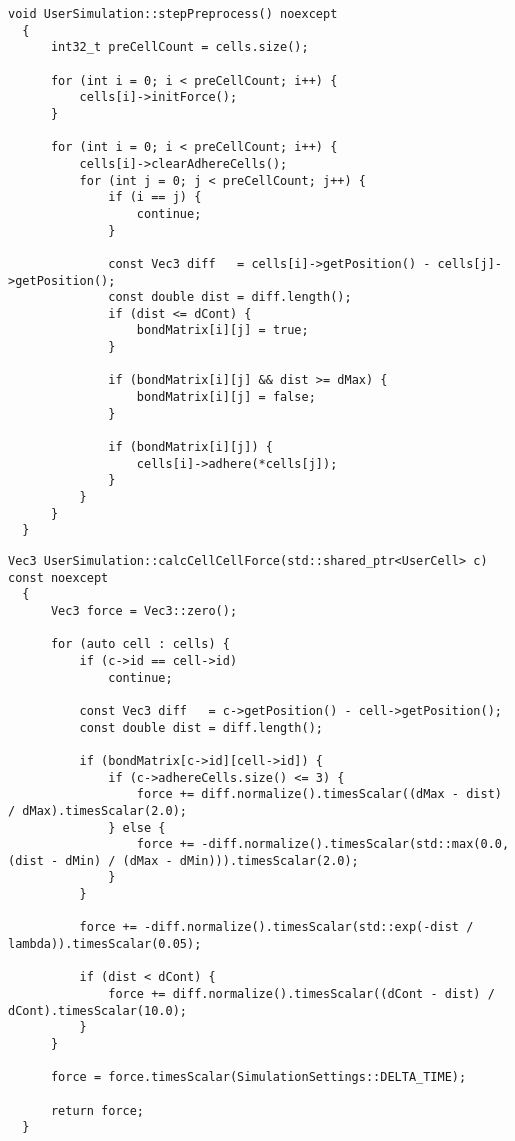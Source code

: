 \documentclass[vipdfmx,a4paper,11pt]{jsarticle}
\begin{document}
\begin{lstlisting}[caption=stepPreprocess()]
  void UserSimulation::stepPreprocess() noexcept
  {
      int32_t preCellCount = cells.size();
  
      for (int i = 0; i < preCellCount; i++) {
          cells[i]->initForce();
      }
  
      for (int i = 0; i < preCellCount; i++) {
          cells[i]->clearAdhereCells();
          for (int j = 0; j < preCellCount; j++) {
              if (i == j) {
                  continue;
              }
  
              const Vec3 diff   = cells[i]->getPosition() - cells[j]->getPosition();
              const double dist = diff.length();
              if (dist <= dCont) {
                  bondMatrix[i][j] = true;
              }
  
              if (bondMatrix[i][j] && dist >= dMax) {
                  bondMatrix[i][j] = false;
              }
  
              if (bondMatrix[i][j]) {
                  cells[i]->adhere(*cells[j]);
              }
          }
      }
  }
\end{lstlisting}

\begin{lstlisting}[caption=calcCellCellForce()]
  Vec3 UserSimulation::calcCellCellForce(std::shared_ptr<UserCell> c) const noexcept
  {
      Vec3 force = Vec3::zero();
  
      for (auto cell : cells) {
          if (c->id == cell->id)
              continue;
  
          const Vec3 diff   = c->getPosition() - cell->getPosition();
          const double dist = diff.length();
  
          if (bondMatrix[c->id][cell->id]) {
              if (c->adhereCells.size() <= 3) {
                  force += diff.normalize().timesScalar((dMax - dist) / dMax).timesScalar(2.0);
              } else {
                  force += -diff.normalize().timesScalar(std::max(0.0, (dist - dMin) / (dMax - dMin))).timesScalar(2.0);
              }
          }
  
          force += -diff.normalize().timesScalar(std::exp(-dist / lambda)).timesScalar(0.05);
  
          if (dist < dCont) {
              force += diff.normalize().timesScalar((dCont - dist) / dCont).timesScalar(10.0);
          }
      }
  
      force = force.timesScalar(SimulationSettings::DELTA_TIME);
  
      return force;
  }
\end{lstlisting}
\end{document}
